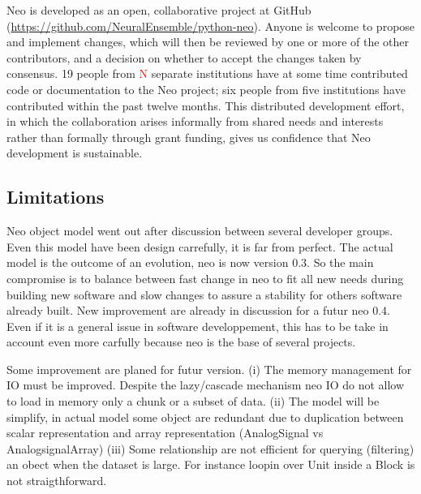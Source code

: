 \documentclass{frontiers}
\newcommand{\missing}[1]{\textcolor{red}{#1}}
\begin{document}
Neo is developed as an open, collaborative project at GitHub
(\url{https://github.com/NeuralEnsemble/python-neo}).
Anyone is welcome to propose and implement changes, which will then be reviewed by one or more of the other contributors, and a decision on whether to accept the changes taken by consensus.
19 people from \missing{N} separate institutions have at some time contributed code or documentation to the Neo project;  six people from five institutions have contributed within the past twelve months.
This distributed development effort, in which the collaboration arises informally from shared needs and interests rather than formally through grant funding, gives us confidence that Neo development is sustainable.


\subsection{Limitations}


Neo object model went out after discussion between several developer groups. Even this model have been design carrefully, it is far from perfect. The actual model is the outcome of an evolution, neo is now version 0.3. So the main compromise is to balance between fast change in neo to fit all new needs during building new software and slow changes to assure a stability for others software already built. New improvement are already in discussion for a futur neo 0.4. Even if it is a general issue in software developpement, this has to be take in account even more carfully because neo is the base of several projects. 

Some improvement are planed for futur version. (i) The memory management for IO must be improved. Despite the lazy/cascade mechanism neo IO do not allow to load in memory only a chunk or a subset of data. (ii) The model will be simplify, in actual model some object are redundant due to duplication between scalar representation and array representation (AnalogSignal vs AnalogsignalArray) (iii) Some relationship are not efficient for querying (filtering) an obect when the dataset is  large. For instance loopin over Unit inside a Block is not straigthforward.
\end{document}

